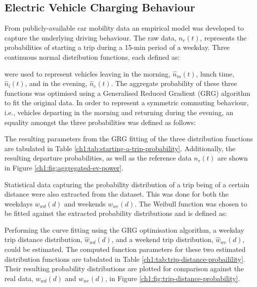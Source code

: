 \subsection{Electric Vehicle Charging Behaviour}

From publicly-available car mobility data \cite{Dallinger2012, MiD2008} an empirical model was developed to capture the underlying driving behaviour. The raw data, $n_{r}(t)$, represents the probabilities of starting a trip during a 15-min period of a weekday. Three continuous normal distribution functions, each defined as:



were used to represent vehicles leaving in the morning, $\hat{n}_{m}(t)$, lunch time, $\hat{n}_{l}(t)$, and in the evening, $\hat{n}_{e}(t)$. The aggregate probability of these three functions was optimised using a Generalised Reduced Gradient (GRG) algorithm to fit the original data. In order to represent a symmetric commuting behaviour, i.e., vehicles departing in the morning and returning during the evening, an equality amongst the three probabilities was defined as follows:



The resulting parameters from the GRG fitting of the three distribution functions are tabulated in Table \ref{ch1:tab:starting-a-trip-probability}. Additionally, the resulting departure probabilities, as well as the reference data $n_r(t)$ are shown in Figure \ref{ch1:fig:aggregated-ev-power}.




Statistical data capturing the probability distribution of a trip being of a certain distance were also extracted from the dataset. This was done for both the weekdays $w_{wd}(d)$ and weekends $w_{we}(d)$. The Weibull function was chosen to be fitted against the extracted probability distributions and is defined as:



Performing the curve fitting using the GRG optimisation algorithm, a weekday trip distance distribution, $\hat{w}_{wd}(d)$, and a weekend trip distribution, $\hat{w}_{we}(d)$, could be estimated. The computed function parameters for these two estimated distribution functions are tabulated in Table \ref{ch1:tab:trip-distance-probailility}. Their resulting probability distributions are plotted for comparison against the real data, $w_{wd}(d)$ and $w_{we}(d)$, in Figure \ref{ch1:fig:trip-distance-probability}.

